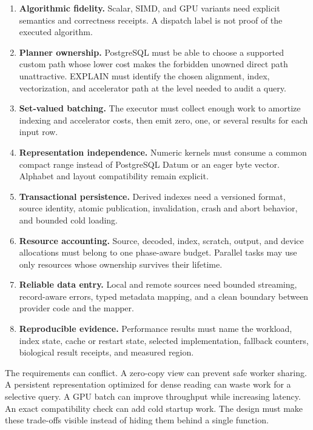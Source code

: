 \begin{enumerate}
  \item \textbf{Algorithmic fidelity.}  Scalar, SIMD, and GPU variants
  need explicit semantics and correctness receipts.  A dispatch label is
  not proof of the executed algorithm.

  \item \textbf{Planner ownership.}  PostgreSQL must be able to choose a
  supported custom path whose lower cost makes the forbidden unowned direct
  path unattractive.  EXPLAIN must identify the chosen alignment, index,
  vectorization, and accelerator path at the level needed to audit a query.

  \item \textbf{Set-valued batching.}  The executor must collect enough
  work to amortize indexing and accelerator costs, then emit zero, one, or
  several results for each input row.

  \item \textbf{Representation independence.}  Numeric kernels must
  consume a common compact range instead of PostgreSQL Datum or an eager
  byte vector.  Alphabet and layout compatibility remain explicit.

  \item \textbf{Transactional persistence.}  Derived indexes need a
  versioned format, source identity, atomic publication, invalidation,
  crash and abort behavior, and bounded cold loading.

  \item \textbf{Resource accounting.}  Source, decoded, index, scratch,
  output, and device allocations must belong to one phase-aware budget.
  Parallel tasks may use only resources whose ownership survives their
  lifetime.

  \item \textbf{Reliable data entry.}  Local and remote sources need
  bounded streaming, record-aware errors, typed metadata mapping, and a
  clean boundary between provider code and the mapper.

  \item \textbf{Reproducible evidence.}  Performance results must name the
  workload, index state, cache or restart state, selected implementation,
  fallback counters, biological result receipts, and measured region.
\end{enumerate}

The requirements can conflict.  A zero-copy view can prevent safe worker
sharing.  A persistent representation optimized for dense reading can
waste work for a selective query.  A GPU batch can improve throughput
while increasing latency.  An exact compatibility check can add cold
startup work.  The design must make these trade-offs visible instead of
hiding them behind a single function.

